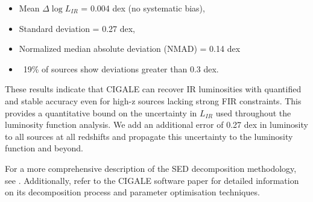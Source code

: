 \begin{itemize}
    \item Mean $\Delta \log L_{IR}$ = 0.004 dex (no systematic bias),
    \item Standard deviation = 0.27 dex,
    \item Normalized median absolute deviation (NMAD) = 0.14 dex
    \item ~19\% of sources show deviations greater than 0.3 dex.
\end{itemize}

These results indicate that CIGALE can recover IR luminosities with quantified and stable accuracy even for high-z sources lacking strong FIR constraints. This provides a quantitative bound on the uncertainty in $L_{IR}$ used throughout the luminosity function analysis. We add an additional error of 0.27 dex in luminosity to all sources at all redshifts and propagate this uncertainty to the luminosity function and beyond.

For a more comprehensive description of the SED decomposition methodology, see \cite{cowley_decoupled_2018}. Additionally, refer to the CIGALE software paper \citep{boquien_cigale_2019} for detailed information on its decomposition process and parameter optimisation techniques. 